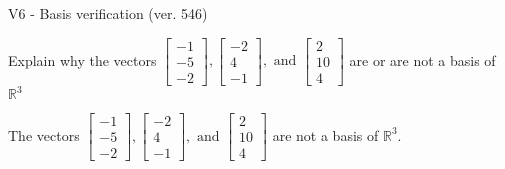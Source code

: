 \begin{exercise}
  \begin{exerciseTitle}V6 - Basis verification (ver. 546)\end{exerciseTitle}
  \begin{exerciseStatement}
    Explain why the vectors \(\left[\begin{array}{r}
-1 \\
-5 \\
-2
\end{array}\right] , \left[\begin{array}{r}
-2 \\
4 \\
-1
\end{array}\right] , \text{ and } \left[\begin{array}{r}
2 \\
10 \\
4
\end{array}\right]\) are or are not a basis of \(\mathbb{R}^3\)	


  \end{exerciseStatement}
  \begin{exerciseAnswer}
   The vectors \(\left[\begin{array}{r}
-1 \\
-5 \\
-2
\end{array}\right] , \left[\begin{array}{r}
-2 \\
4 \\
-1
\end{array}\right] , \text{ and } \left[\begin{array}{r}
2 \\
10 \\
4
\end{array}\right]\) 
  	 are not  a basis of \(\mathbb{R}^3\).
  


  \end{exerciseAnswer}
\end{exercise}